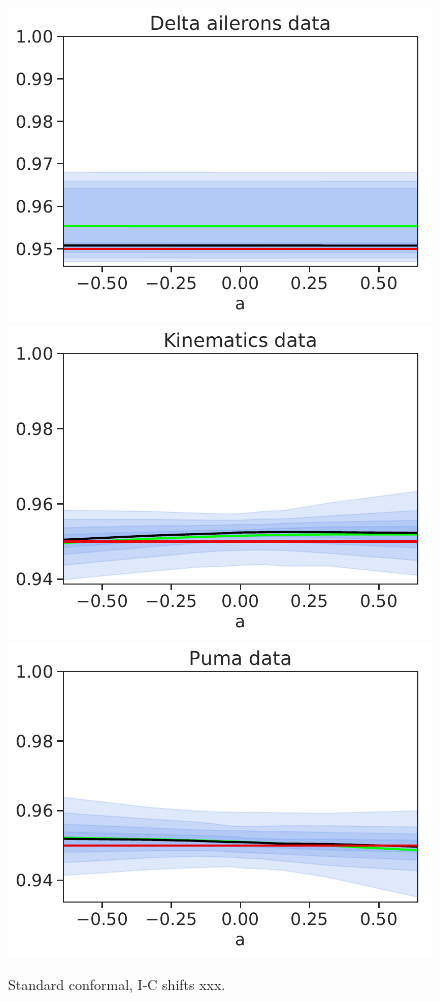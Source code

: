 \begin{figure}[h!]
    \\
    \includegraphics[width=0.3\linewidth]{figs/uci/delta_coverage_Standard_I-C.pdf}
    \hfill
    \includegraphics[width=0.3\linewidth]{figs/uci/kin_coverage_Standard_I-C.pdf}
    \hfill
    \includegraphics[width=0.3\linewidth]{figs/uci/puma_coverage_Standard_I-C.pdf}  
    \caption{Standard conformal, I-C shifts xxx.}
    \label{fig:XXX}
\end{figure}

